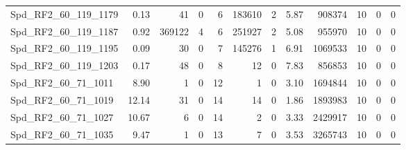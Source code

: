 \begin{longtable}[c]{@{}lrrrrrrrrrrr@{}}
Spd\_RF2\_60\_119\_1179       & 0.13                   & 41                      & 0                       & 6                      & 183610                  & 2                       & 5.87                    & 908374                   & 10                       & 0                        & 0                        \\
Spd\_RF2\_60\_119\_1187       & 0.92                   & 369122                  & 4                       & 6                      & 251927                  & 2                       & 5.08                    & 955970                   & 10                       & 0                        & 0                        \\
Spd\_RF2\_60\_119\_1195       & 0.09                   & 30                      & 0                       & 7                      & 145276                  & 1                       & 6.91                    & 1069533                  & 10                       & 0                        & 0                        \\
Spd\_RF2\_60\_119\_1203       & 0.17                   & 48                      & 0                       & 8                      & 12                      & 0                       & 7.83                    & 856853                   & 10                       & 0                        & 0                        \\
Spd\_RF2\_60\_71\_1011        & 8.90                   & 1                       & 0                       & 12                     & 1                       & 0                       & 3.10                    & 1694844                  & 10                       & 0                        & 0                        \\
Spd\_RF2\_60\_71\_1019        & 12.14                  & 31                      & 0                       & 14                     & 14                      & 0                       & 1.86                    & 1893983                  & 10                       & 0                        & 0                        \\
Spd\_RF2\_60\_71\_1027        & 10.67                  & 6                       & 0                       & 14                     & 2                       & 0                       & 3.33                    & 2429917                  & 10                       & 0                        & 0                        \\
Spd\_RF2\_60\_71\_1035        & 9.47                   & 1                       & 0                       & 13                     & 7                       & 0                       & 3.53                    & 3265743                  & 10                       & 0                        & 0                        \\

\end{longtable}
